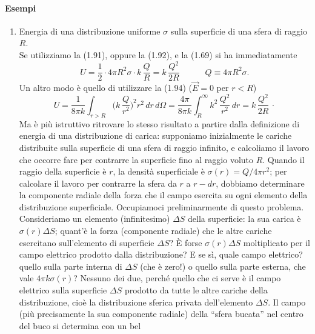 \paragraph{Esempi}
\begin{enumerate}
  \item Energia di una distribuzione uniforme $\sigma$ sulla superficie di una
    sfera di raggio $R$.\\
    Se utilizziamo la (1.91), oppure la (1.92), e la (1.69) si ha immediatamente
    \begin{equation}
      U=\frac12\cdot4\pi R^2\sigma\cdot k\,\frac QR=k\,\frac{Q^2}{2R}
      \qquad\quad Q\equiv4\pi R^2\sigma.
      \tag{1.95}
    \end{equation}
    Un altro modo \`e quello di utilizzare la (1.94) ($\vec E=0$ per $r<R$)
    \[
      U=\frac{1}{8\pi k}\int_{r>R}\Big(k\,\frac{Q}{r^2}\Big)^2r^2\,dr\,d\Omega
      =\frac{4\pi}{8\pi k}\int_R^\infty k^2\,\frac{Q^2}{r^2}\,dr
      =k\,\frac{Q^2}{2R}\,\cdot
    \]
    Ma \`e pi\`u istruttivo ritrovare lo stesso risultato a partire dalla
    definizione di energia di una distribuzione di carica: supponiamo
    inizialmente le cariche distribuite sulla superficie di una sfera di raggio
    infinito, e calcoliamo il lavoro che occorre fare per contrarre la
    superficie fino al raggio voluto $R$. Quando il raggio della superficie \`e
    $r$, la densit\`a superficiale \`e $\sigma(r)=Q/4\pi r^2$; per calcolare il
    lavoro per contrarre la sfera da $r$ a $r-dr$, dobbiamo determinare la
    componente radiale della forza che il campo esercita su ogni elemento della
    distribuzione superficiale. Occupiamoci preliminarmente di questo
    problema.\\
    Consideriamo un elemento (infinitesimo) $\Delta S$ della superficie: la sua
    carica \`e $\sigma(r)\Delta S$; quant'\`e la forza (componente radiale) che
    le altre cariche esercitano sull'elemento di superficie $\Delta S$? \`E
    forse $\sigma(r)\Delta S$ moltiplicato per il campo elettrico
    prodotto dalla distribuzione? E se s\`i, quale campo elettrico? quello sulla
    parte interna di $\Delta S$ (che \`e zero!) o quello sulla parte esterna,
    che vale $4\pi k\sigma(r)$? Nessuno dei due, perch\'e quello che ci serve
    \`e il campo elettrico sulla superficie $\Delta S$ prodotto da tutte le
    altre cariche della distribuzione, cio\`e la distribuzione sferica privata
    dell'elemento $\Delta S$. Il campo (pi\`u precisamente la sua componente
    radiale) della ``sfera bucata'' nel centro del buco si determina con un bel

\end{enumerate}
